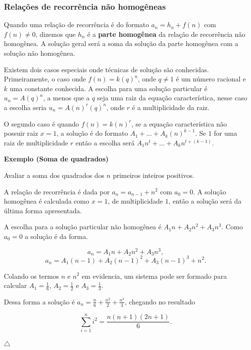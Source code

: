 \subsubsection{Relações de recorrência não homogêneas}

Quando uma relação de recorrência é do formato $a_n = h_n + f(n)$ com $f(n) \neq 0$, dizemos que $h_n$ é a \textbf{parte homogênea} da relação de recorrência não homogênea. A solução geral será a soma da solução da parte homogênea com a solução não homogênea.

Existem dois casos especiais onde técnicas de solução são conhecidas. Primeiramente, o caso onde $f(n) = k(q)^n$, onde $q \neq 1$ é um número racional e $k$ uma constante conhecida. A escolha para uma solução particular é $u_n = A(q)^n$, a menos que a $q$ seja uma raiz da equação característica, nesse caso a escolha seria $u_n = A(n)^r(q)^n$, onde $r$ é a multiplicidade da raiz.

O segundo caso é quando $f(n) = k(n)^r$, se a equação característica não possuir raiz $x = 1$, a solução é do formato $A_1 + ... + A_k(n)^{k-1}$. Se $1$ for uma raiz de multiplicidade $r$ então a escolha será $A_1n^t + ... + A_kn^{t+(k-1)}$.

\textbf{Exemplo (Soma de quadrados)} 

Avaliar a soma dos quadrados dos $n$ primeiros inteiros positivos.

A relação de recorrência é dada por $a_n = a_{n-1} + n^2$ com $a_0 = 0$. A solução homogênea é calculada como $x = 1$, de multiplicidade $1$, então a solução será da última forma apresentada.

A escolha para a solução particular não homogênea é $A_1n + A_2n^2 + A_3n^3$. Como $a_0 = 0$ a solução é da forma.

\[a_n = A_1n + A_2n^2 + A_3n^3,\]
\[a_n  = A_1(n-1) + A_2(n-1)^2 + A_3(n-1)^3 + n^2.\]

Colando os termos $n$ e $n^2$ em evidencia, um sistema pode ser formado para calcular $A_1 = \frac{1}{6}$, $A_2 = \frac{1}{2}$ e $A_3 = \frac{1}{3}$.

Dessa forma a solução é $a_n = \frac{n}{6} + \frac{n^2}{2} + \frac{n^3}{3}$, chegando no resultado

\[\sum_{i=1}^{n} i^2 = \frac{n(n+1)(2n+1)}{6}.\]

{\raggedleft $\bigtriangleup$ \par}
